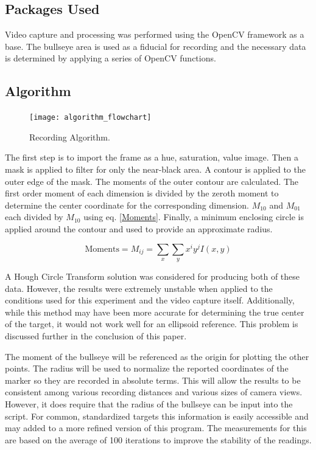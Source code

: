 \documentclass[conference]{IEEEtran}
\begin{document}
\subsection{Packages Used}

Video capture and processing was performed using the 
OpenCV \cite{itseez2015opencv, itseez2014theopencv} framework as a base.
The bullseye area is used as a fiducial for recording and 
the necessary data is determined by applying a series of OpenCV functions.

\subsection{Algorithm}

\begin{figure}[]
	\centering
	\texttt{[image: algorithm\_flowchart]}
	\caption{Recording Algorithm.}
	\label{fig:capture_algorithm}
\end{figure}

The first step is to import the frame as a hue, saturation, value image.
Then a mask is applied to filter for only the near-black area.
A contour is applied to the outer edge of the mask.
The moments of the outer contour are calculated.
The first order moment of each dimension is divided by the zeroth moment to determine the center coordinate for the corresponding dimension.
$M_{10}$ and $M_{01}$ each divided by $M_{10}$ using eq. \eqref{Moments}.
Finally, a minimum enclosing circle is applied around the contour and used to provide an approximate radius.

\begin{equation}\label{Moments}
	\text{Moments} = M_{ij} = \sum_{x} \sum_{y} x^i y^j I(x,y)
\end{equation}

A Hough Circle Transform solution \cite{Hough1964} was considered for producing both of these data.
However, the results were extremely unstable when applied to the conditions used for this experiment and the video capture itself.
Additionally, while this method may have been more accurate for determining the true center of the target, it would not work well for an ellipsoid reference.
This problem is discussed further in the conclusion of this paper.

The moment of the bullseye will be referenced as the origin for plotting the other points. 
The radius will be used to normalize the reported coordinates of the marker so they are recorded in absolute terms.
This will allow the results to be consistent among various recording distances and various sizes of camera views.
However, it does require that the radius of the bullseye can be input into the script.
For common, standardized targets this information is easily accessible
\cite{issfRules} and may added to a more refined version of this program.
The measurements for this are based on the average of 100 iterations to improve the stability of the readings.
\end{document}
